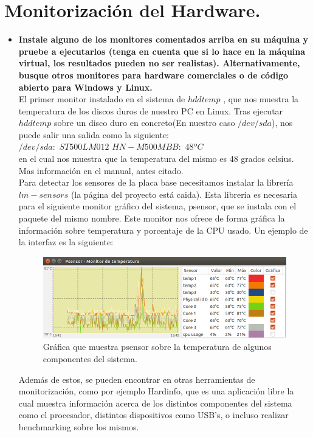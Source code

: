 \section{Monitorización del Hardware.}

\begin{itemize}
	\item \textbf{Instale alguno de los monitores comentados arriba en su máquina y
		pruebe a ejecutarlos (tenga en cuenta que si lo hace en la máquina virtual, los
		resultados pueden no ser realistas). Alternativamente, busque otros monitores para
		hardware comerciales o de código abierto para Windows y Linux.}\\
	El primer monitor instalado en el sistema de $hddtemp$ \cite{hddtemp}, que nos muestra la temperatura de los discos duros de nuestro PC en Linux. Tras ejecutar $hddtemp$ sobre un disco duro en concreto(En nuestro caso $/dev/sda$), nos puede salir una salida como la siguiente:\\
	
	$/dev/sda:$ $ST500LM012$ $HN-M500MBB:$ $48ºC$\\
	
	en el cual nos muestra que la temperatura del mismo es 48 grados celsius. Mas información en el manual, antes citado.\\
	
	Para detectar los sensores de la placa base necesitamos instalar la librería $lm-sensors$ \cite{sensors}(la página del proyecto está caida). Esta librería es necesaria para el siguiente monitor gráfico del sistema, psensor, que se instala con el paquete del mismo nombre. Este monitor nos ofrece de forma gráfica la información sobre temperatura y porcentaje de la CPU usado. Un ejemplo de la interfaz es la siguiente:\\
	
	\begin{figure}[H]
	\centering
	\includegraphics[width=0.7\linewidth]{psensor}
	\caption[psensor]{Gráfica que muestra psensor sobre la temperatura de algunos componentes del sistema.}
	\label{fig:psensor}
	\end{figure}
	
	Además de estos, se pueden encontrar en \cite{HWMon} otras herramientas de monitorización, como por ejemplo Hardinfo\cite{hardinfo}, que es una aplicación libre la cual muestra información acerca de los distintos componentes del sistema como el procesador, distintos dispositivos como USB's, o incluso realizar benchmarking sobre los mismos.\\
	

\end{itemize}
